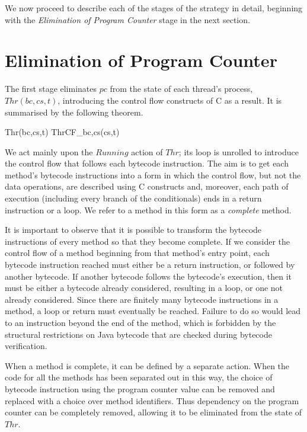 We now proceed to describe each of the stages of the strategy in
detail, beginning with the \emph{Elimination of Program Counter} stage
in the next section.

\section{Elimination of Program Counter}
\label{elimination-of-program-counter-section}

The first stage eliminates $pc$ from the state of each thread's
process, $Thr(bc,cs,t)$, introducing the control flow constructs of C
as a result. 
It is summarised by the following theorem.
%
\begin{thm}\label{thread-splitting-thm}
  \begin{circus}
    Thr(bc,cs,t) \circrefines ThrCF_{bc,cs}(cs,t)
  \end{circus}%
\end{thm}
%
We act mainly upon the $Running$ action of $Thr$; its loop is unrolled
to introduce the control flow that follows each bytecode instruction.
The aim is to get each method's bytecode instructions into a form in
which the control flow, but not the data operations, are described
using C constructs and, moreover, each path of execution (including
every branch of the conditionals) ends in a return instruction or a
loop.
We refer to a method in this form as a \emph{complete} method.

It is important to observe that it is possible to transform the
bytecode instructions of every method so that they become complete.
If we consider the control flow of a method beginning from that
method's entry point, each bytecode instruction reached must either be
a return instruction, or followed by another bytecode.
If another bytecode follows the bytecode's execution, then it must be
either a bytecode already considered, resulting in a loop, or one not
already considered.
Since there are finitely many bytecode instructions in a method, a
loop or return must eventually be reached.
Failure to do so would lead to an instruction beyond the end of the
method, which is forbidden by the structural restrictions on Java
bytecode that are checked during bytecode verification. 

When a method is complete, it can be defined by a separate \Circus{}
action.
When the code for all the methods has been separated out in this way,
the choice of bytecode instruction using the program counter value can
be removed and replaced with a choice over method identifiers.
Thus dependency on the program counter can be completely removed,
allowing it to be eliminated from the state of $Thr$.

